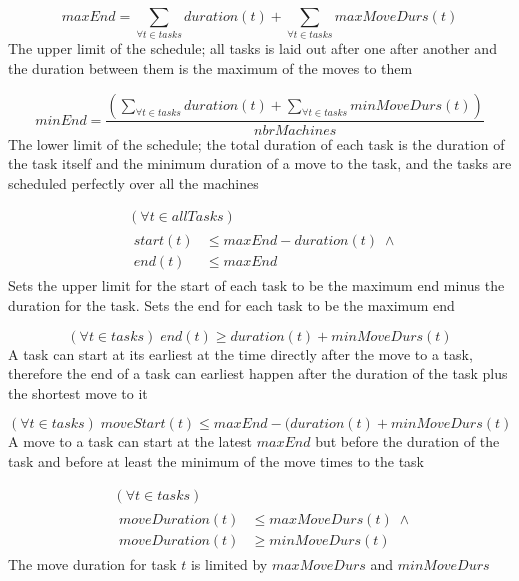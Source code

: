 \documentclass[10pt,a4paper]{report}
\begin{document}
\begin{equation}\label{eq:59}
maxEnd = \sum_{\forall t \in tasks} duration(t) + \sum_{\forall t \in tasks} maxMoveDurs(t)
\end{equation}
The upper limit of the schedule; all tasks is laid out after one after another and the duration between them is the maximum of the moves to them

\begin{equation}\label{eq:60}
minEnd = \frac{\left(\sum_{\forall t \in tasks} duration(t) + \sum_{\forall t \in tasks} minMoveDurs(t)\right)}{nbrMachines}
\end{equation}
The lower limit of the schedule; the total duration of each task is the duration of the task itself and the minimum duration of a move to the task, and the tasks are scheduled perfectly over all the machines

\begin{equation}\label{eq:61}
\begin{aligned}
&(\forall t \in allTasks)\\
&\begin{aligned}
start(t) &\le maxEnd-duration(t) \; \land\\
end(t) &\le maxEnd
\end{aligned}
\end{aligned}
\end{equation}
Sets the upper limit for the start of each task to be the maximum end minus the duration for the task. Sets the end for each task to be the maximum end

\begin{equation}\label{eq:62}
(\forall t \in tasks) \; end(t) \ge duration(t) + minMoveDurs(t)\end{equation}
A task can start at its earliest at the time directly after the move to a task, therefore the end of a task can earliest happen after the duration of the task plus the shortest move to it

\begin{equation}\label{eq:63}
(\forall t \in tasks) \; moveStart(t) \le maxEnd-(duration(t)+minMoveDurs(t)\end{equation}
A move to a task can start at the latest $maxEnd$ but before the duration of the task and before at least the minimum of the move times to the task

\begin{equation}
\begin{aligned}\label{eq:64}
&(\forall t \in tasks)\\
&\begin{aligned}
moveDuration(t) &\le maxMoveDurs(t) \; \land\\
moveDuration(t) &\ge minMoveDurs(t)
\end{aligned}
\end{aligned}
\end{equation}
The move duration for task $t$ is limited by $maxMoveDurs$ and $minMoveDurs$
\end{document}
